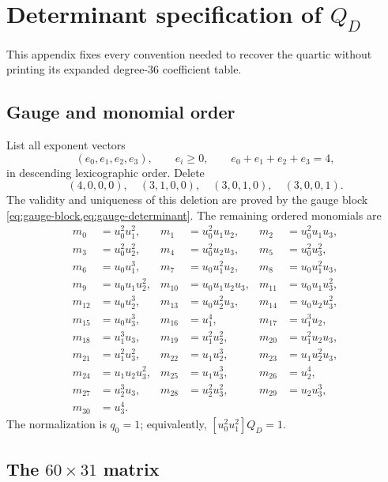 \section{Determinant specification of \texorpdfstring{\(Q_D\)}{Q-D}}
\label{app:quartic-specification}

This appendix fixes every convention needed to recover the quartic without
printing its expanded degree-\(36\) coefficient table.

\subsection{Gauge and monomial order}

List all exponent vectors
\[
 (e_0,e_1,e_2,e_3),\qquad e_i\ge0,\qquad
 e_0+e_1+e_2+e_3=4,
\]
in descending lexicographic order.  Delete
\[
 (4,0,0,0),\quad(3,1,0,0),\quad(3,0,1,0),\quad(3,0,0,1).
\]
The validity and uniqueness of this deletion are proved by the gauge block
\cref{eq:gauge-block,eq:gauge-determinant}.  The remaining ordered monomials
are
\begin{align*}
m_0&=u_0^2u_1^2,&
m_1&=u_0^2u_1u_2,&
m_2&=u_0^2u_1u_3,\\
m_3&=u_0^2u_2^2,&
m_4&=u_0^2u_2u_3,&
m_5&=u_0^2u_3^2,\\
m_6&=u_0u_1^3,&
m_7&=u_0u_1^2u_2,&
m_8&=u_0u_1^2u_3,\\
m_9&=u_0u_1u_2^2,&
m_{10}&=u_0u_1u_2u_3,&
m_{11}&=u_0u_1u_3^2,\\
m_{12}&=u_0u_2^3,&
m_{13}&=u_0u_2^2u_3,&
m_{14}&=u_0u_2u_3^2,\\
m_{15}&=u_0u_3^3,&
m_{16}&=u_1^4,&
m_{17}&=u_1^3u_2,\\
m_{18}&=u_1^3u_3,&
m_{19}&=u_1^2u_2^2,&
m_{20}&=u_1^2u_2u_3,\\
m_{21}&=u_1^2u_3^2,&
m_{22}&=u_1u_2^3,&
m_{23}&=u_1u_2^2u_3,\\
m_{24}&=u_1u_2u_3^2,&
m_{25}&=u_1u_3^3,&
m_{26}&=u_2^4,\\
m_{27}&=u_2^3u_3,&
m_{28}&=u_2^2u_3^2,&
m_{29}&=u_2u_3^3,\\
m_{30}&=u_3^4.&&&
\end{align*}
The normalization is \(q_0=1\); equivalently,
\([u_0^2u_1^2]Q_D=1\).

\subsection{The \texorpdfstring{\(60\times31\)}{60 by 31} matrix}

